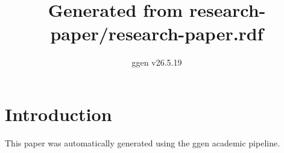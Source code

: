 \documentclass{article}
\title{Generated from research-paper/research-paper.rdf}
\author{ggen v26.5.19}
\begin{document}
\maketitle
\section{Introduction}
This paper was automatically generated using the ggen academic pipeline.
\end{document}
